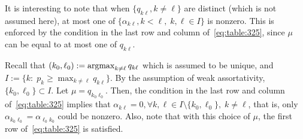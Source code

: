   It is interesting to note that when $\{q_{k \ell}, k \neq \ell\}$ are distinct (which is not assumed here), at most one of $\{\alpha_{k \ell}, k < \ell,\; k, \ell \in I\}$ is nonzero. This is enforced by the condition in the last row and column of~\eqref{eq:table:325}, since $\mu$ can be equal to at most one of $q_{k\ell}$. 


  Recall that $(k_0,\ell_0) := \operatorname*{argmax}_{k \neq \ell} q_{k\ell}$ which is assumed to be unique, and $I := \{k :\; p_k \ge \max_{k \neq \ell} q_{k \ell}\}$. By the assumption of weak assortativity, $\{k_0,\ell_0\} \subset I$.
  Let $\mu = q_{k_0 \ell_0}$. Then, the condition in the last row and column of~\eqref{eq:table:325} implies that $\alpha_{k \ell} = 0, \forall k,\ell \in I\setminus\{ k_0,\ell_0\},\; k \neq \ell$, that is, only $\alpha_{k_0 \ell_0} = \alpha_{\ell_0 k_0}$ could be nonzero. Also, note that with this choice of $\mu$, the first row of~\eqref{eq:table:325} is satisfied.

